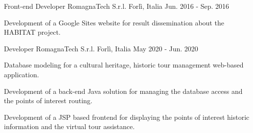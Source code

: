 

\begin{cventries}

  \cventry
    {Front-end Developer} %
    {RomagnaTech S.r.l.} %
    {Forlì, Italia} %
    {Jun. 2016 - Sep. 2016} %
    {
      \begin{cvitems} %
        \item {Development of a Google Sites website for result dissemination about the HABITAT project.}
      \end{cvitems}
    }

  \cventry
    {Developer} %
    {RomagnaTech S.r.l.} %
    {Forlì, Italia} %
    {May 2020 - Jun. 2020} %
    {
      \begin{cvitems} %
        \item {Database modeling for a cultural heritage, historic tour management web-based application.}
        \item {Development of a back-end Java solution for managing the database access and the points of interest routing.}
        \item {Development of a JSP based frontend for displaying the points of interest historic information and the virtual tour assistance.}
      \end{cvitems}
    }

\end{cventries}
